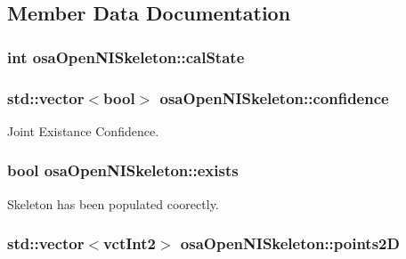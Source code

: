 \subsection{Member Data Documentation}
\hypertarget{classosa_open_n_i_skeleton_a3edad6b75218a0029aba98aacdf19aae}{}
\subsubsection[{cal\+State}]{\setlength{\rightskip}{0pt plus 5cm}int osa\+Open\+N\+I\+Skeleton\+::cal\+State}\label{classosa_open_n_i_skeleton_a3edad6b75218a0029aba98aacdf19aae}
\hypertarget{classosa_open_n_i_skeleton_ac7f0ce45a28ff3065dc83f2e71175987}{}
\subsubsection[{confidence}]{\setlength{\rightskip}{0pt plus 5cm}std\+::vector$<$bool$>$ osa\+Open\+N\+I\+Skeleton\+::confidence}\label{classosa_open_n_i_skeleton_ac7f0ce45a28ff3065dc83f2e71175987}


Joint Existance Confidence. 

\hypertarget{classosa_open_n_i_skeleton_aaad274b86c6213c48c1aa2bdcd053195}{}
\subsubsection[{exists}]{\setlength{\rightskip}{0pt plus 5cm}bool osa\+Open\+N\+I\+Skeleton\+::exists}\label{classosa_open_n_i_skeleton_aaad274b86c6213c48c1aa2bdcd053195}


Skeleton has been populated coorectly. 

\hypertarget{classosa_open_n_i_skeleton_af72455ac2eb4611fefc465d08a415b59}{}
\subsubsection[{points2\+D}]{\setlength{\rightskip}{0pt plus 5cm}std\+::vector$<${\bf vct\+Int2}$>$ osa\+Open\+N\+I\+Skeleton\+::points2\+D}\label{classosa_open_n_i_skeleton_af72455ac2eb4611fefc465d08a415b59}


